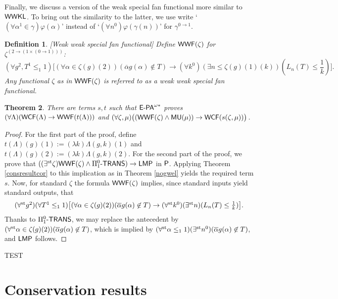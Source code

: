 \documentclass[reqno]{amsart}
\newtheorem{thm}{Theorem}
\newtheorem{defi}[thm]{Definition}
\def\bdefi{\begin{defi}\rm}
\def\edefi{\end{defi}}
\def\MU{\textup{\textsf{MU}}}
\def\WWKL{\textup{\textsf{WWKL}}}
\def\P{\textup{\textsf{P}}}
\def\st{\textup{st}}
\def\di{\rightarrow}
\def\paai{\Pi_{1}^{0}\textup{-\textsf{TRANS}}}
\def\WWF{\textup{\textsf{WWF}}}
\def\LMP{\textup{\textsf{LMP}}}
\def\WCF{\textup{\textsf{WCF}}}
\numberwithin{equation}{section}
\numberwithin{thm}{section}
\begin{document}
Finally, we discuss a version of the weak special fan functional more similar to $\WWKL$.  To bring out the similarity to the latter, we use write `$(\forall \alpha^{1} \in \gamma)\varphi(\alpha)$' instead of `$(\forall n^{0})\varphi(\gamma(n))$' for $\gamma^{0\di 1}$. 
\bdefi[Weak weak special fan functional] 
Define $\WWF(\zeta)$ for $\zeta^{(2\di (1\times (0\di 1)))}$:
\[\textstyle
(\forall g^{2}, T^{1}\leq_{1}1)\big[(\forall \alpha \in \zeta(g)(2))  (\overline{\alpha}g(\alpha)\not\in T)
\di   (\forall k^{0})(\exists n\leq\zeta(g)(1)(k) ) (L_{n}(T)\leq\frac{1}{k})\big].
\]
Any functional $\zeta$ as in $\WWF(\zeta)$ is referred to as a \emph{weak weak special fan functional}.
\edefi
\begin{thm}
There are terms $s, t$ such that $\textsf{\textup{E-PA}}^{\omega*}$ proves $(\forall \Lambda)(\WCF(\Lambda)\di \WWF(t(\Lambda)))$ 
and $(\forall \zeta, \mu)\big((\WWF(\zeta)\wedge \MU(\mu))\di \WCF(s(\zeta,\mu))\big)$. 
\end{thm}
\begin{proof}
For the first part of the proof, define $t(\Lambda)(g)(1):=(\lambda k)\Lambda(g,k)(1)$ and $t(\Lambda)(g)(2):= (\lambda k)\Lambda(g,k)(2)$.  For the second part of the proof, we prove that 
$((\exists^{\st} \zeta)\WWF(\zeta)\wedge \paai)\di \LMP$ in $\P$.  Applying Theorem \ref{consresultcor} to this implication as in Theorem \ref{nogwel} yields the required term $s$.  
Now, for standard $\zeta$ the formula $\WWF(\zeta)$ implies, since standard inputs yield standard outputs, that
\[\textstyle
(\forall^{\st} g^{2})(\forall T^{1}\leq_{1}1)\big[(\forall \alpha \in \zeta(g)(2))  (\overline{\alpha}g(\alpha)\not\in T)
\di   (\forall^{\st} k^{0})(\exists^{\st} n ) (L_{n}(T)\leq\frac{1}{k})\big].
\]
Thanks to $\paai$, we may replace the antecedent by $(\forall^{\st} \alpha \in \zeta(g)(2))  (\overline{\alpha}g(\alpha)\not\in T)$, 
which is implied by $(\forall^{\st}\alpha\leq_{1}1)(\exists^{\st}n^{0})(\overline{\alpha}g(\alpha)\not\in T)$, and $\LMP$ follows.   
\end{proof}

TEST

\appendix

\section{Conservation results}\label{conssec}
\end{document}
